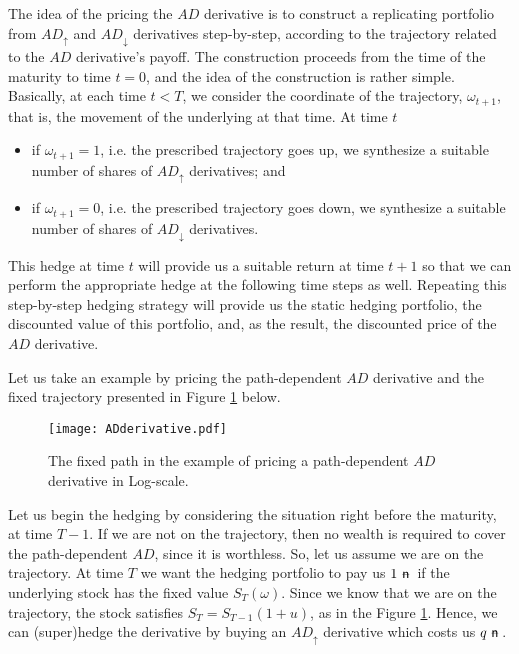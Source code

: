 \documentclass{amsart}
\theoremstyle{definition}
\theoremstyle{remark}
\newcommand{\n}{\!\!\ \nn \!\!\ }
\def\nn{\mathrel{%
    \mathchoice{\n}{\n}{\scriptsize\n}{\tiny\n}%
}}
\def\n {{%
    \setbox0\hbox{ \textsf{n}\!\  }%
    \rlap{\hbox to \wd0{\hss \!\ --\hss}}\box0
}}
\numberwithin{equation}{section}
\newcommand{\1}{\boldsymbol{1}}
\newcommand{\ua}{\uparrow}
\newcommand{\da}{\downarrow}
\begin{document}
The idea of the pricing the $AD$ derivative is to construct a replicating portfolio from $AD_{\ua}$ and $AD_{\da}$ derivatives step-by-step, according to the trajectory related to the $AD$ derivative's payoff.
The construction proceeds from the time of the maturity to time $t=0$, and the idea of the construction is rather simple. Basically, at each time $t<T$, we consider the coordinate of the trajectory, $\omega_{t+1}$, that is, the movement of the underlying at that time. At time $t$
\begin{itemize}
\item  if $\omega_{t+1}=1$, i.e. the prescribed trajectory goes up, we synthesize a suitable number of shares of $AD_\ua$ derivatives; and
\item if $\omega_{t+1}=0$, i.e. the prescribed trajectory goes down, we synthesize a suitable number of shares of $AD_\da$ derivatives.
\end{itemize}
This hedge at time $t$ will provide us a suitable return at time $t+1$ so that we can perform the appropriate hedge at the following time steps as well. Repeating this step-by-step hedging strategy will provide us the static hedging portfolio, the discounted value of this portfolio, and, as the result, the discounted price of the $AD$ derivative.

Let us take an example by pricing the path-dependent $AD$ derivative and the fixed trajectory presented in Figure \ref{figure:ADderivative} below.
 

\begin{figure}[h!]
\begin{center}
\texttt{[image: ADderivative.pdf]}
\caption{The fixed path in the example of pricing a path-dependent $AD$ derivative in Log-scale.}
\label{figure:ADderivative}
\end{center}
\end{figure}

Let us begin the hedging by considering the situation right before the maturity, at time $T-1$. If we are not on the trajectory, then no wealth is required to cover the path-dependent $AD$, since it is worthless. So, let us assume we are on the trajectory. At time $T$ we want the hedging portfolio to pay us $1\n$ if the underlying stock has the fixed value $S_T(\omega)$. Since we know that we are on the trajectory, the stock satisfies $S_T=S_{T-1}(1+u)$, as in the Figure \ref{figure:ADderivative}. Hence, we can (super)hedge the derivative by buying an $AD_{\ua}$ derivative which costs us $q\n$.
\end{document}
